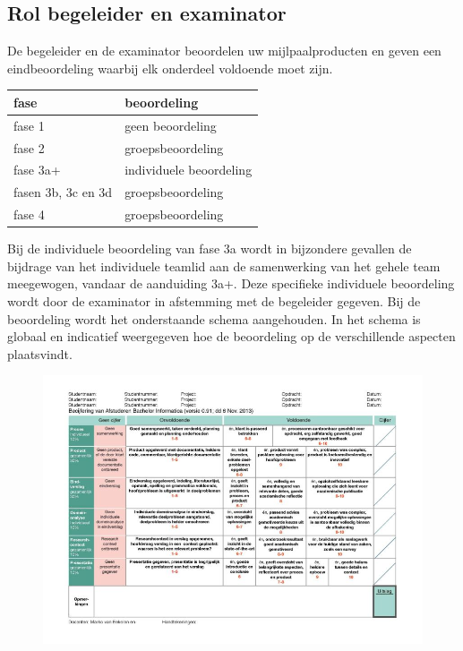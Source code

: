 \subsection{Rol begeleider en examinator}
De begeleider en de examinator beoordelen uw mijlpaalproducten en geven een
eindbeoordeling waarbij elk onderdeel voldoende moet zijn.

\begin{center}
    \begin{tabular}{ll}
	\hline
	{\bf fase} 		& {\bf beoordeling}\\\hline
	fase 1 			& geen beoordeling\\
	fase 2 			& groepsbeoordeling\\
	fase 3a+ 		& individuele beoordeling\\
	fasen 3b, 3c en 3d 	& groepsbeoordeling\\
	fase 4   		& groepsbeoordeling\\
	\hline
    \end{tabular}
\end{center}

Bij de individuele beoordeling van fase 3a wordt in bijzondere gevallen de
bijdrage van het individuele teamlid aan de samenwerking van het gehele team
meegewogen, vandaar de aanduiding 3a+. Deze specifieke individuele beoordeling
wordt door de examinator in afstemming met de begeleider gegeven. Bij
de beoordeling wordt het onderstaande schema aangehouden. In het schema is
globaal en indicatief weergegeven hoe de beoordeling op de verschillende
aspecten plaatsvindt.

\begin{figure}
    \begin{center}
	\includegraphics[width=.95\textwidth]{voorbeeld-ABI-cijfer.jpg}
    \end{center}
\end{figure}

